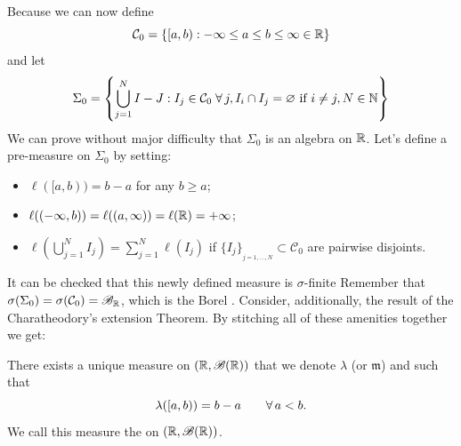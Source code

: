 \documentclass{report}
\begin{document}
\begin{revise}
Because we can now define
\[\mathcal{C}_0=\{[a,b):-\infty\leq a\leq b\leq\infty\in\mathbb{R}\}\]
and let
\[ \Sigma_0=\left\{\bigcup_{j=1}^N I-J:I_j\in\mathcal{C}_0\;\forall\, j,I_i\cap I_j=\varnothing\text{ if }i\neq j,N\in\mathbb{N} \right\} \]
We can prove without major difficulty that $\Sigma_0$ is an algebra on $\mathbb{R}$. Let's define a pre-measure on $\Sigma_0$ by setting:
\begin{itemize}
	\item $\ell([a,b))=b-a$ for any $b\geq a$;
	\item $\ell((-\infty,b))=\ell((a,\infty))=\ell(\mathbb{R})=+\infty$;
	\item $\ell\left(\bigcup_{j=1}^N I_j\right)=\sum_{j=1}^{N}\ell(I_j)$ if $\{I_j\}_{_{j=1,\ldots,N}}\subset\mathcal{C}_0$ are pairwise disjoints.
\end{itemize}
It can be checked that this newly defined measure is $\sigma$-finite
Remember that $\sigma(\Sigma_0)=\sigma(\mathcal{C}_0)=\mathscr{B}_{\mathbb{R}}$, which is the Borel \sa{}. 
Consider, additionally, the result of the Charatheodory's extension Theorem. By stitching all of these amenities together we get:
\begin{theorem}
	There exists a unique measure  on $(\mathbb{R},\mathscr{B}(\mathbb{R}))$ that we denote $\lambda$ (or $\mathfrak{m}$) and such that
	\[\lambda([a,b))=b-a\qquad\forall\, a<b.\]
	We call this measure the  on $(\mathbb{R},\mathscr{B}(\mathbb{R}))$.
\end{theorem}
\begin{flushright}
	\hspace*{1.5cm}
\end{flushright}
\hspace{2cm}
\begin{flushright}
\end{flushright}
\end{revise}
\end{document}
